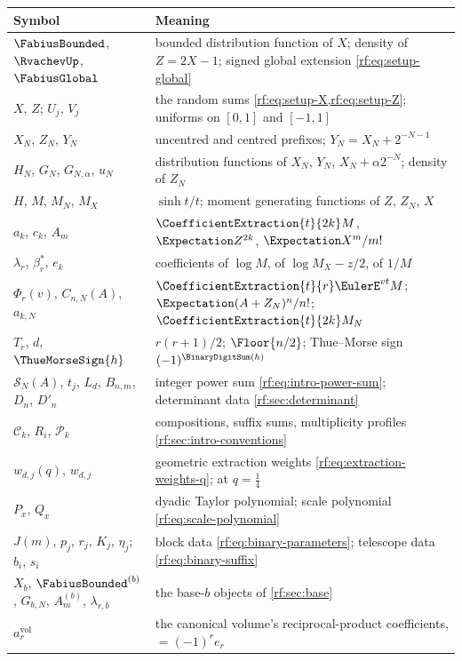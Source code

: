 \documentclass[11pt,oneside]{article}
\theoremstyle{plain}
\theoremstyle{definition}
\theoremstyle{remark}
\newcommand{\Fb}{\FabiusBounded}            %
\newcommand{\Fg}{\FabiusGlobal}             %
\newcommand{\up}{\RvachevUp}                %
\newcommand{\tm}[1]{\ThueMorseSign{#1}}     %
\newcommand{\E}{\Expectation}
\newcommand{\coeff}[2]{\CoefficientExtraction{#1}{#2}}
\newcommand{\Comp}[1]{\mathcal{C}_{#1}}     %
\newcommand{\Prof}[1]{\mathcal{P}_{#1}}     %
\newcommand{\Spow}[2]{\mathcal{S}_{#1}(#2)} %
\newcommand{\Tr}[1]{T_{#1}}                 %
\newcommand{\amvol}[1]{a^{\mathrm{vol}}_{#1}} %
\begin{document}
\begin{center}
\renewcommand{\arraystretch}{1.2}
\small
\begin{tabularx}{\textwidth}{@{}lX@{}}
\toprule
Symbol & Meaning\\
\midrule
$\Fb$, $\up$, $\Fg$ & bounded distribution function of $X$; density of $Z=2X-1$; signed global extension \cref{rf:eq:setup-global}\\
$X$, $Z$; $U_{j}$, $V_{j}$ & the random sums \cref{rf:eq:setup-X,rf:eq:setup-Z}; uniforms on $[0,1]$ and $[-1,1]$\\
$X_{N}$, $Z_{N}$, $Y_{N}$ & uncentred and centred prefixes; $Y_{N}=X_{N}+2^{-N-1}$\\
$H_{N}$, $G_{N}$, $G_{N,\alpha}$, $u_{N}$ & distribution functions of $X_{N}$, $Y_{N}$, $X_{N}+\alpha2^{-N}$; density of $Z_{N}$\\
$H$, $M$, $M_{N}$, $M_{X}$ & $\sinh t/t$; moment generating functions of $Z$, $Z_{N}$, $X$\\
$a_{k}$, $c_{k}$, $A_{m}$ & $\coeff{t}{2k}M$, $\E Z^{2k}$, $\E X^{m}/m!$\\
$\lambda_{r}$, $\beta^{\ast}_{r}$, $e_{k}$ & coefficients of $\log M$, of $\log M_{X}-z/2$, of $1/M$\\
$\Phi_{r}(v)$, $C_{n,N}(A)$, $a_{k,N}$ & $\coeff{t}{r}\EulerE^{vt}M$; $\E(A+Z_{N})^{n}/n!$; $\coeff{t}{2k}M_{N}$\\
$\Tr{r}$, $d$, $\tm{h}$ & $r(r+1)/2$; $\Floor{n/2}$; Thue--Morse sign $(-1)^{\BinaryDigitSum(h)}$\\
$\Spow{N}{A}$, $t_{j}$, $L_{d}$, $B_{n,m}$, $D_{n}$, $D'_{n}$ & integer power sum \cref{rf:eq:intro-power-sum}; determinant data \cref{rf:sec:determinant}\\
$\Comp{k}$, $R_{i}$, $\Prof{k}$ & compositions, suffix sums, multiplicity profiles \cref{rf:sec:intro-conventions}\\
$w_{d,j}(q)$, $w_{d,j}$ & geometric extraction weights \cref{rf:eq:extraction-weights-q}; at $q=\tfrac14$\\
$P_{x}$, $Q_{x}$ & dyadic Taylor polynomial; scale polynomial \cref{rf:eq:scale-polynomial}\\
$J(m)$, $p_{j}$, $r_{j}$, $K_{j}$, $\eta_{j}$; $b_{i}$, $s_{i}$ & block data \cref{rf:eq:binary-parameters}; telescope data \cref{rf:eq:binary-suffix}\\
$X_{b}$, $\Fb^{(b)}$, $G_{b,N}$, $A^{(b)}_{m}$, $\lambda_{r,b}$ & the base-$b$ objects of \cref{rf:sec:base}\\
$\amvol{r}$ & the canonical volume's reciprocal-product coefficients, $=(-1)^{r}e_{r}$\\
\bottomrule
\end{tabularx}
\end{center}
\end{document}
